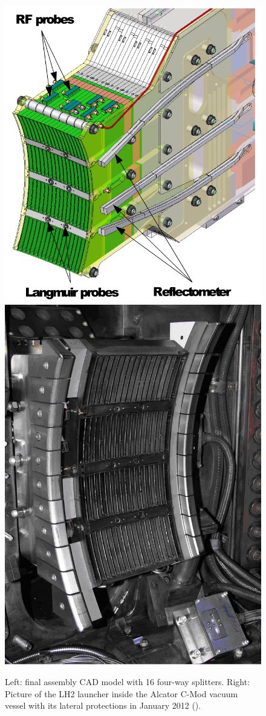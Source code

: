 \begin{figure}[h]
	\centering
	\includegraphics[width=0.4\linewidth]{figures/chap3/FourWaySplitter_CAD}
	\includegraphics[width=0.35\linewidth]{figures/chap3/CMod_LH2}
	\caption{Left: final assembly CAD model with 16 four-way splitters. Right: Picture of the LH2 launcher inside the Alcator C-Mod vacuum vessel with its lateral protections in January 2012 ().}
	\label{fig:cmodlh2}
\end{figure}

